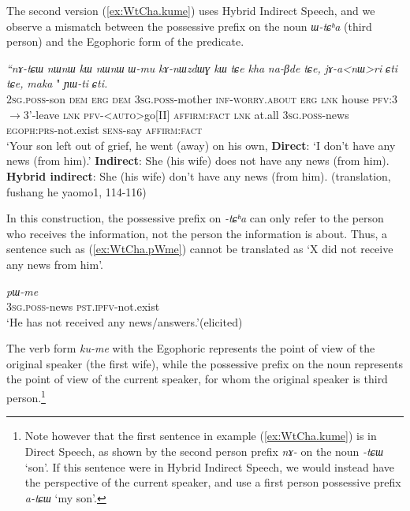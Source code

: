 \documentclass[11pt]{article}
\newcommand{\ipa}[1]{{\phon\textit{#1}}} %
\newcommand{\refb}[1]{(\ref{#1})}
\newcommand{\bleu}[1]{{\color{blue}#1}}
\newcommand{\rouge}[1]{{\color{red}#1}}
\begin{document}
The second version \refb{ex:WtCha.kume} uses Hybrid Indirect Speech, and we observe a mismatch between the possessive prefix on the noun \ipa{ɯ-tɕʰa} (third person) and the Egophoric form of the predicate.

 \begin{exe}
\ex \label{ex:WtCha.kume}
 \gll %
 \ipa{``nɤ-tɕɯ} 	\ipa{nɯnɯ} 	\ipa{kɯ} 	\ipa{nɯnɯ} 	\ipa{ɯ-mu} 	\ipa{kɤ-nɯzdɯɣ} 	\ipa{kɯ} 	\ipa{tɕe} 	\ipa{kha} 	\ipa{na-βde} 	\ipa{tɕe,} 	\ipa{jɤ-a<nɯ>ri} 	\ipa{ɕti} 	\ipa{tɕe,} 	\ipa{maka} 	\rouge{\ipa{ɯ-tɕʰa}} 	\bleu{\ipa{ku-me}"} 	\ipa{ɲɯ-ti} 	\ipa{ɕti.} \\
 \textsc{2sg.poss}-son \textsc{dem} \textsc{erg} \textsc{dem} \textsc{3sg.poss}-mother \textsc{inf}-\textsc{worry.about}  \textsc{erg} \textsc{lnk} house \textsc{pfv}:3$\rightarrow$3'-leave \textsc{lnk} \textsc{pfv-<auto>}go[II] \textsc{affirm:fact} \textsc{lnk} at.all \rouge{\textsc{3sg.poss}-news} \bleu{\textsc{egoph:prs}-not.exist} \textsc{sens}-say \textsc{affirm:fact}  \\
\glt  `Your son left out of grief, he went (away) on his own, 
\glt \textbf{Direct}: `\bleu{I don't have} any news (from him).' 
\glt \textbf{Indirect}: \rouge{She (his wife) does not have} any news (from him).
\glt \textbf{Hybrid indirect}: \rouge{She (his wife)} \bleu{don't have} any news (from him).
\glt (translation, fushang he yaomo1, 114-116)
\end{exe}

In this construction, the possessive prefix on \ipa{-tɕʰa} can only refer to the person who receives the information, not the person the information is about. Thus, a sentence such as (\ref{ex:WtCha.pWme}) cannot be translated as `X did not receive any news from him'.

\begin{exe}
\ex \label{ex:WtCha.pWme}
\gll \ipa{ɯ-tɕʰa} \ipa{pɯ-me} \\
\textsc{3sg.poss}-news \textsc{pst.ipfv}-not.exist \\
\glt `He has not received any news/answers.'(elicited)
\end{exe}


The verb form \ipa{ku-me} with the Egophoric represents the point of view of the original speaker (the first wife), while the possessive prefix on the noun represents the point of view of the current speaker, for whom the original speaker is third person.\footnote{Note however that the first sentence in example (\ref{ex:WtCha.kume}) is in Direct Speech, as shown by the second person prefix \ipa{nɤ-} on the noun \ipa{-tɕɯ} `son'. If this sentence were in Hybrid Indirect Speech, we would instead have the perspective of the current speaker, and use a first person possessive prefix \ipa{a-tɕɯ} `my son'.} 
\end{document}
